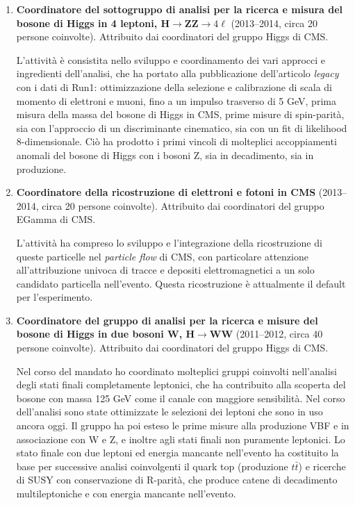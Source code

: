 \documentclass[11pt,twoside,a4paper]{article}
\begin{document}
\begin{enumerate}
\item \textbf{Coordinatore del sottogruppo di analisi per la ricerca e
  misura del bosone di Higgs in 4 leptoni, H$\to$ZZ$\to4\ell$}
  (2013--2014, circa 20 persone coinvolte). Attribuito dai
  coordinatori del gruppo Higgs di CMS.

  L'attivit\`a \`e consistita nello sviluppo e coordinamento dei vari
  approcci e ingredienti dell'analisi, che ha portato alla
  pubblicazione dell'articolo \textit{legacy} con i dati di Run1:
  ottimizzazione della selezione e calibrazione di scala di momento di
  elettroni e muoni, fino a un impulso trasverso di 5 GeV, prima
  misura della massa del bosone di Higgs in CMS, prime misure di
  spin-parit\`a, sia con l'approccio di un discriminante cinematico,
  sia con un fit di likelihood 8-dimensionale. Ci\`o ha prodotto i
  primi vincoli di molteplici accoppiamenti anomali del bosone di
  Higgs con i bosoni Z, sia in decadimento, sia in produzione.

\item \textbf{Coordinatore della ricostruzione di elettroni e fotoni in CMS}
  (2013--2014, circa 20 persone coinvolte). Attribuito dai
  coordinatori del gruppo EGamma di CMS.
  
  L'attivit\`a ha compreso lo sviluppo e l'integrazione della
  ricostruzione di queste particelle nel \textit{particle flow} di
  CMS, con particolare attenzione all'attribuzione univoca di tracce e
  depositi elettromagnetici a un solo candidato particella
  nell'evento. Questa ricostruzione \`e attualmente il default per
  l'esperimento.
  
\item \textbf{Coordinatore del gruppo di analisi per la ricerca e
  misure del bosone di Higgs in due bosoni W, H$\to$WW} (2011--2012,
  circa 40 persone coinvolte). Attribuito dai coordinatori del gruppo
  Higgs di CMS.
  
  Nel corso del mandato ho coordinato molteplici gruppi coinvolti
  nell'analisi degli stati finali completamente leptonici, che ha
  contribuito alla scoperta del bosone con massa 125 GeV come il
  canale con maggiore sensibilit\`a. Nel corso dell'analisi sono
  state ottimizzate le selezioni dei leptoni che sono in uso ancora
  oggi. Il gruppo ha poi esteso le prime misure alla produzione VBF
  e in associazione con W e Z, e inoltre agli stati finali non
  puramente leptonici. Lo stato finale con due leptoni ed energia
  mancante nell'evento ha costituito la base per successive analisi
  coinvolgenti il quark top (produzione $t\bar t$) e ricerche di
  SUSY con conservazione di R-parit\`a, che produce catene di
  decadimento multileptoniche e con energia mancante nell'evento.


\end{enumerate}
\end{document}
